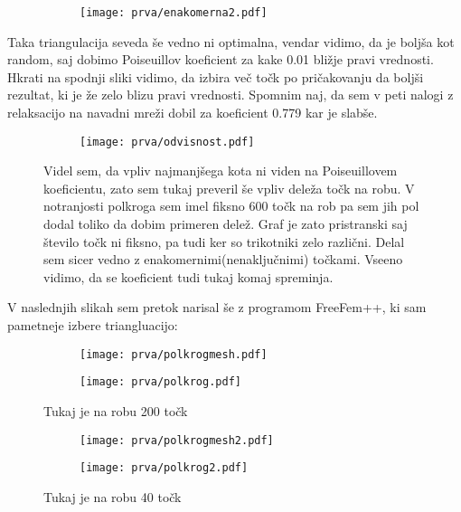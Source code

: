 \documentclass{article}
\begin{document}
\begin{figure}[H]
\centering
\begin{subfigure}{\textwidth}
\texttt{[image: prva/enakomerna2.pdf]}
\end{subfigure}
\caption*{}
\end{figure}

Taka triangulacija seveda še vedno ni optimalna, vendar vidimo, da je boljša kot random, saj dobimo Poiseuillov koeficient za kake 0.01 bližje pravi vrednosti. Hkrati na spodnji sliki vidimo, da izbira več točk po pričakovanju da boljši rezultat, ki je že zelo blizu pravi vrednosti. Spomnim naj, da sem v peti nalogi z relaksacijo na navadni mreži dobil za koeficient 0.779 kar je slabše.


\begin{figure}[H]
\centering
\begin{subfigure}{\textwidth}
\texttt{[image: prva/odvisnost.pdf]}
\end{subfigure}
\caption*{Videl sem, da vpliv najmanjšega kota ni viden na Poiseuillovem koeficientu, zato sem tukaj preveril še vpliv deleža točk na robu. V notranjosti polkroga sem imel fiksno 600 točk na rob pa sem jih pol dodal toliko da dobim primeren delež. Graf je zato pristranski saj število točk ni fiksno, pa tudi ker so trikotniki zelo različni. Delal sem sicer vedno z enakomernimi(nenaključnimi) točkami. Vseeno vidimo, da se koeficient tudi tukaj komaj spreminja.}
\end{figure}


V naslednjih slikah sem pretok narisal še z programom FreeFem++, ki sam pametneje izbere triangluacijo:

\begin{figure}[H]
\centering
\begin{subfigure}{.49\textwidth}
\texttt{[image: prva/polkrogmesh.pdf]}
\end{subfigure}
\begin{subfigure}{.49\textwidth}
\texttt{[image: prva/polkrog.pdf]}
\end{subfigure}
\caption*{Tukaj je na robu 200 točk}
\end{figure}

\begin{figure}[H]
\centering
\begin{subfigure}{.49\textwidth}
\texttt{[image: prva/polkrogmesh2.pdf]}
\end{subfigure}
\begin{subfigure}{.49\textwidth}
\texttt{[image: prva/polkrog2.pdf]}
\end{subfigure}
\caption*{Tukaj je na robu 40 točk}
\end{figure}
\end{document}
